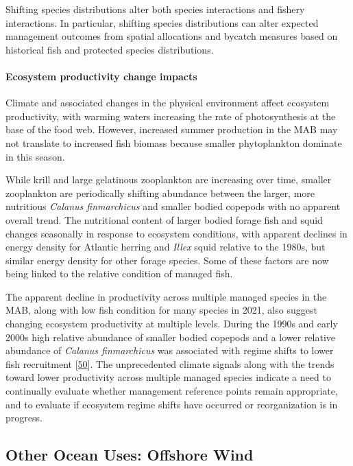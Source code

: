 \documentclass[
  10pt,
]{article}
\begin{document}
Shifting species distributions alter both species interactions and
fishery interactions. In particular, shifting species distributions can
alter expected management outcomes from spatial allocations and bycatch
measures based on historical fish and protected species distributions.

\hypertarget{ecosystem-productivity-change-impacts}{%
\paragraph{Ecosystem productivity change
impacts}\label{ecosystem-productivity-change-impacts}}

Climate and associated changes in the physical environment affect
ecosystem productivity, with warming waters increasing the rate of
photosynthesis at the base of the food web. However, increased summer
production in the MAB may not translate to increased fish biomass
because smaller phytoplankton dominate in this season.

While krill and large gelatinous zooplankton are increasing over time,
smaller zooplankton are periodically shifting abundance between the
larger, more nutritious \emph{Calanus finmarchicus} and smaller bodied
copepods with no apparent overall trend. The nutritional content of
larger bodied forage fish and squid changes seasonally in response to
ecosystem conditions, with apparent declines in energy density for
Atlantic herring and \emph{Illex} squid relative to the 1980s, but
similar energy density for other forage species. Some of these factors
are now being linked to the relative condition of managed fish.

The apparent decline in productivity across multiple managed species in
the MAB, along with low fish condition for many species in 2021, also
suggest changing ecosystem productivity at multiple levels. During the
1990s and early 2000s high relative abundance of smaller bodied copepods
and a lower relative abundance of \emph{Calanus finmarchicus} was
associated with regime shifts to lower fish recruitment
{[}\protect\hyperlink{ref-perretti_regime_2017}{50}{]}. The
unprecedented climate signals along with the trends toward lower
productivity across multiple managed species indicate a need to
continually evaluate whether management reference points remain
appropriate, and to evaluate if ecosystem regime shifts have occurred or
reorganization is in progress.

\hypertarget{other-ocean-uses-offshore-wind}{%
\subsection{Other Ocean Uses: Offshore
Wind}\label{other-ocean-uses-offshore-wind}}
\end{document}
